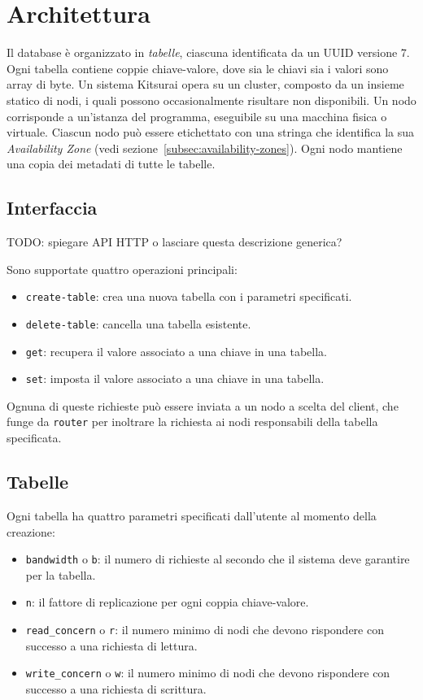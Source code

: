 \section{Architettura}
\label{sec:architettura}

Il database è organizzato in \emph{tabelle}, ciascuna identificata da un UUID versione 7\cite{rfc9562}.
Ogni tabella contiene coppie chiave-valore, dove sia le chiavi sia i valori sono array di byte.
Un sistema Kitsurai opera su un cluster, composto da un insieme statico di nodi, i quali possono occasionalmente risultare non disponibili.
Un nodo corrisponde a un'istanza del programma, eseguibile su una macchina fisica o virtuale.
Ciascun nodo può essere etichettato con una stringa che identifica la sua \emph{Availability Zone} (vedi sezione~\ref{subsec:availability-zones}).
Ogni nodo mantiene una copia dei metadati di tutte le tabelle.

\subsection{Interfaccia}
\label{subsec:interfaccia}

TODO: spiegare API HTTP o lasciare questa descrizione generica?

\vspace{1em}

Sono supportate quattro operazioni principali:
\begin{itemize}
    \item \texttt{create-table}: crea una nuova tabella con i parametri specificati.
    \item \texttt{delete-table}: cancella una tabella esistente.
    \item \texttt{get}: recupera il valore associato a una chiave in una tabella.
    \item \texttt{set}: imposta il valore associato a una chiave in una tabella.
\end{itemize}

Ognuna di queste richieste può essere inviata a un nodo a scelta del client, che funge da \texttt{router} per inoltrare la richiesta ai nodi responsabili della tabella specificata.

\subsection{Tabelle}
\label{subsec:tabelle}

Ogni tabella ha quattro parametri specificati dall'utente al momento della creazione:
\begin{itemize}
    \item \texttt{bandwidth} o \texttt{b}: il numero di richieste al secondo che il sistema deve garantire per la tabella.
    \item \texttt{n}: il fattore di replicazione per ogni coppia chiave-valore.
    \item \texttt{read\_concern} o \texttt{r}: il numero minimo di nodi che devono rispondere con successo a una richiesta di lettura.
    \item \texttt{write\_concern} o \texttt{w}: il numero minimo di nodi che devono rispondere con successo a una richiesta di scrittura.
\end{itemize}

